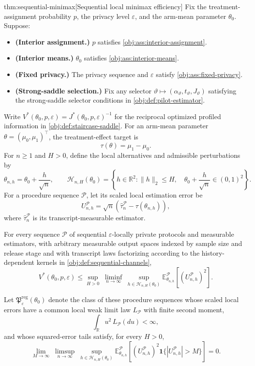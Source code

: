 \documentclass[11pt]{article}
\begin{document}
\begin{theoremv}{thm:sequential-minimax}[Sequential local minimax efficiency]
Fix the treatment-assignment probability \(p\), the privacy level \(\varepsilon\), and the arm-mean parameter \(\theta_0\). Suppose:
\begin{itemize}
\item \textbf{(Interior assignment.)} \(p\) satisfies \cref{obj:ass:interior-assignment}.
\item \textbf{(Interior means.)} \(\theta_0\) satisfies \cref{obj:ass:interior-means}.
\item \textbf{(Fixed privacy.)} The privacy sequence and \(\varepsilon\) satisfy \cref{obj:ass:fixed-privacy}.
\item \textbf{(Strong-saddle selection.)} Fix any selector \(\vartheta\mapsto(\alpha_{\vartheta},t_{\vartheta},J_{\vartheta})\) satisfying the strong-saddle selector conditions in \cref{obj:def:pilot-estimator}.
\end{itemize}
Write \(V^*(\theta_0,p,\varepsilon)=J^*(\theta_0,p,\varepsilon)^{-1}\) for the reciprocal optimized profiled information in \cref{obj:def:staircase-saddle}. For an arm-mean parameter \(\theta=(\mu_0,\mu_1)^\top\), the treatment-effect target is
\[
\tau(\theta)=\mu_1-\mu_0.
\]
For \(n\ge1\) and \(H>0\), define the local alternatives and admissible perturbations by
\[
\theta_{n,h}=\theta_0+\frac{h}{\sqrt n},
\qquad
\mathcal H_{n,H}(\theta_0)
=
\left\{
h\in\mathbb R^2:
\|h\|_2\le H,\quad
\theta_0+\frac{h}{\sqrt n}\in(0,1)^2
\right\}.
\]
For a procedure sequence \(\mathcal P\), let its scaled local estimation error be
\[
U_{n,h}^{\mathcal P}
=
\sqrt n\left(
\widehat\tau_n^{\mathcal P}-\tau(\theta_{n,h})
\right),
\]
where \(\widehat\tau_n^{\mathcal P}\) is its transcript-measurable estimator.

For every sequence \(\mathcal P\) of sequential \(\varepsilon\)-locally private protocols and measurable estimators, with arbitrary measurable output spaces indexed by sample size and release stage and with transcript laws factorizing according to the history-dependent kernels in \cref{obj:def:sequential-channels},
\[
V^*(\theta_0,p,\varepsilon)
\le
\sup_{H>0}\;\liminf_{n\to\infty}\;
\sup_{h\in\mathcal H_{n,H}(\theta_0)}
\mathbb E_{\theta_{n,h}}^{\mathcal P}
\!\left[(U_{n,h}^{\mathcal P})^2\right].
\]

Let \(\mathfrak P^{\mathrm{reg}}_{\varepsilon}(\theta_0)\) denote the class of these procedure sequences whose scaled local errors have a common local weak limit law \(L_{\mathcal P}\) with finite second moment,
\[
\int_{\mathbb R}u^2\,L_{\mathcal P}(du)<\infty,
\]
and whose squared-error tails satisfy, for every \(H>0\),
\[
\lim_{M\to\infty}\;\limsup_{n\to\infty}\;
\sup_{h\in\mathcal H_{n,H}(\theta_0)}
\mathbb E_{\theta_{n,h}}^{\mathcal P}
\!\left[
(U_{n,h}^{\mathcal P})^2
\mathbf 1\{|U_{n,h}^{\mathcal P}|>M\}
\right]
=0.
\]


\end{theoremv}
\end{document}
